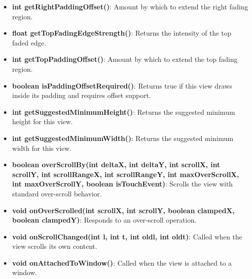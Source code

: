 \documentclass{report}
\begin{document}
\begin{itemize}
\begin{itemize}
                \item \textbf{int getRightPaddingOffset()}:  
                    Amount by which to extend the right fading region.

                \item \textbf{float getTopFadingEdgeStrength()}:  
                    Returns the intensity of the top faded edge.

                \item \textbf{int getTopPaddingOffset()}:  
                    Amount by which to extend the top fading region.

                \item \textbf{boolean isPaddingOffsetRequired()}:  
                    Returns true if this view draws inside its padding and requires offset support.

                \item \textbf{int getSuggestedMinimumHeight()}:  
                    Returns the suggested minimum height for this view.

                \item \textbf{int getSuggestedMinimumWidth()}:  
                    Returns the suggested minimum width for this view.

                \item \textbf{boolean overScrollBy(int deltaX, int deltaY, int scrollX, int scrollY, int scrollRangeX, int scrollRangeY, int maxOverScrollX, int maxOverScrollY, boolean isTouchEvent)}:  
                    Scrolls the view with standard over-scroll behavior.

                \item \textbf{void onOverScrolled(int scrollX, int scrollY, boolean clampedX, boolean clampedY)}:  
                    Responds to an over-scroll operation.

                \item \textbf{void onScrollChanged(int l, int t, int oldl, int oldt)}:  
                    Called when the view scrolls its own content.

                \item \textbf{void onAttachedToWindow()}:  
                    Called when the view is attached to a window.


\end{itemize}
\end{itemize}
\end{document}
